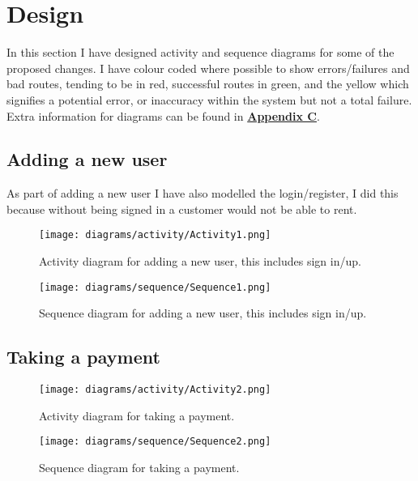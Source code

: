 \section{Design}
  In this section I have designed activity and sequence diagrams for some of the proposed changes. I have colour coded where possible to show
  errors/failures and bad routes, tending to be in red, successful routes in green, and the yellow which signifies a potential error, or
  inaccuracy within the system but not a total failure. Extra information for diagrams can be found in \hyperref[sec:AppendixC]{\textbf{Appendix C}}.

  \subsection{Adding a new user}
    As part of adding a new user I have also modelled the login/register, I did this because without being signed in a customer
    would not be able to rent.

    \begin{figure}[H]
      \centering
      \texttt{[image: diagrams/activity/Activity1.png]}
      \caption{Activity diagram for adding a new user, this includes sign in/up.}
      \label{fig:newUserActivity}
    \end{figure}

    \begin{figure}[H]
      \centering
      \texttt{[image: diagrams/sequence/Sequence1.png]}
      \caption{Sequence diagram for adding a new user, this includes sign in/up.}
      \label{fig:newUserSequence}
    \end{figure}
  
  \newpage
  
  \subsection{Taking a payment}
  \label{sec:design:payment}
  
    \begin{figure}[H]
      \centering
      \texttt{[image: diagrams/activity/Activity2.png]}
      \caption{Activity diagram for taking a payment.}
      \label{fig:takePaymentActivity}
    \end{figure}

    \begin{figure}[H]
      \centering
      \texttt{[image: diagrams/sequence/Sequence2.png]}
      \caption{Sequence diagram for taking a payment.}
      \label{fig:takePaymentSequence}
    \end{figure}

